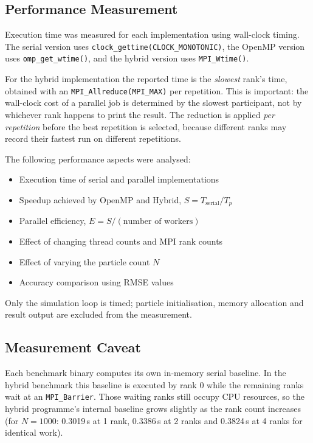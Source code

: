 \documentclass[11pt,a4paper]{article}
\begin{document}
\subsection{Performance Measurement}

Execution time was measured for each implementation using wall-clock timing.
The serial version uses \texttt{clock\_gettime(CLOCK\_MONOTONIC)}, the OpenMP
version uses \texttt{omp\_get\_wtime()}, and the hybrid version uses
\texttt{MPI\_Wtime()}.

For the hybrid implementation the reported time is the \emph{slowest} rank's
time, obtained with an \texttt{MPI\_Allreduce(MPI\_MAX)} per repetition. This
is important: the wall-clock cost of a parallel job is determined by the
slowest participant, not by whichever rank happens to print the result.
The reduction is applied \emph{per repetition} before the best repetition is
selected, because different ranks may record their fastest run on different
repetitions.

The following performance aspects were analysed:
\begin{itemize}
  \item Execution time of serial and parallel implementations
  \item Speedup achieved by OpenMP and Hybrid, $S = T_{\text{serial}} / T_{p}$
  \item Parallel efficiency, $E = S / (\text{number of workers})$
  \item Effect of changing thread counts and MPI rank counts
  \item Effect of varying the particle count $N$
  \item Accuracy comparison using RMSE values
\end{itemize}

Only the simulation loop is timed; particle initialisation, memory allocation
and result output are excluded from the measurement.

\subsection{Measurement Caveat}

Each benchmark binary computes its own in-memory serial baseline. In the
hybrid benchmark this baseline is executed by rank 0 while the remaining ranks
wait at an \texttt{MPI\_Barrier}. Those waiting ranks still occupy CPU
resources, so the hybrid programme's internal baseline grows slightly as the
rank count increases (for $N=1000$: 0.3019\,s at 1 rank, 0.3386\,s at 2 ranks
and 0.3824\,s at 4 ranks for identical work).
\end{document}
